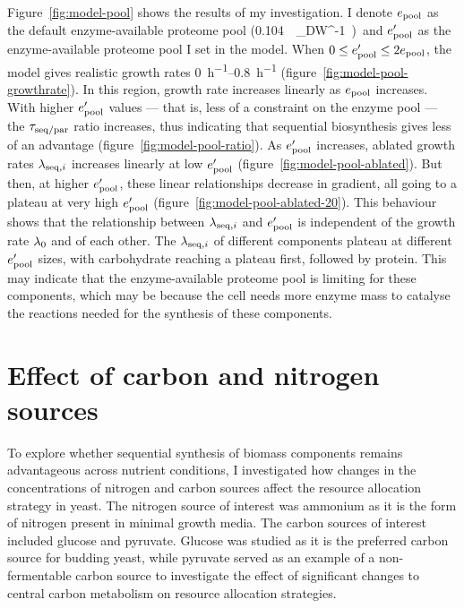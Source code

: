 Figure~\ref{fig:model-pool} shows the results of my investigation.
I denote $e_{\mathrm{pool}}$ as the default enzyme-available proteome pool (\SI{0.104}{\gram~\gram_{DW}^{-1}}) and $e_{\mathrm{pool}}^{\prime}$ as the enzyme-available proteome pool I set in the model.
When $0 \leq e_{\mathrm{pool}}^{\prime} \leq 2e_{\mathrm{pool}}$, the model gives realistic growth rates \SIrange{0}{0.8}{\hour^{-1}} (figure~\ref{fig:model-pool-growthrate}).
In this region, growth rate increases linearly as $e_{\mathrm{pool}}$ increases.
With higher $e_{\mathrm{pool}}^{\prime}$ values --- that is, less of a constraint on the enzyme pool --- the $\tau_{\mathrm{seq}/\mathrm{par}}$ ratio increases, thus indicating that sequential biosynthesis gives less of an advantage (figure~\ref{fig:model-pool-ratio}).
As $e_{\mathrm{pool}}^{\prime}$ increases, ablated growth rates $\lambda_{\mathrm{seq},i}$ increases linearly at low $e_{\mathrm{pool}}^{\prime}$ (figure~\ref{fig:model-pool-ablated}).
But then, at higher $e_{\mathrm{pool}}^{\prime}$, these linear relationships decrease in gradient, all going to a plateau at very high $e_{\mathrm{pool}}^{\prime}$ (figure~\ref{fig:model-pool-ablated-20}).
This behaviour shows that the relationship between $\lambda_{\mathrm{seq},i}$ and $e_{\mathrm{pool}}^{\prime}$ is independent of the growth rate $\lambda_{0}$ and of each other.
The $\lambda_{\mathrm{seq},i}$ of different components plateau at different $e_{\mathrm{pool}}^{\prime}$ sizes, with carbohydrate reaching a plateau first, followed by protein.
This may indicate that the enzyme-available proteome pool is limiting for these components, which may be because the cell needs more enzyme mass to catalyse the reactions needed for the synthesis of these components.


\section{Effect of carbon and nitrogen sources}
\label{sec:model-exchange}

To explore whether sequential synthesis of biomass components remains advantageous across nutrient conditions, I investigated how changes in the concentrations of nitrogen and carbon sources affect the resource allocation strategy in yeast.
The nitrogen source of interest was ammonium as it is the form of nitrogen present in minimal growth media.
The carbon sources of interest included glucose and pyruvate.
Glucose was studied as it is the preferred carbon source for budding yeast, while pyruvate served as an example of a non-fermentable carbon source to investigate the effect of significant changes to central carbon metabolism on resource allocation strategies.

